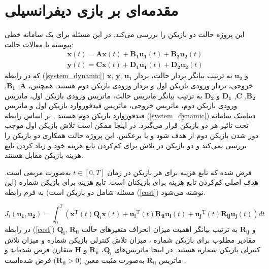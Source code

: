 \section{ مقدمه‌ای بر بازی دیفرانسیلی}\label{diffgameover}

 این پروژه حالت دو بازیکن را بررسی می‌کند. در این مسئله برای یک سامانه خطی پیوسته با معالات حالت:
 \begin{equation}\label{system_dynamic}
 	\begin{split}
 		 	&\boldsymbol{\dot x}(t) = \boldsymbol{Ax}(t) + \boldsymbol{B_1u_1}(t) + \boldsymbol{B_2u_2}(t)%
 		\\
 		&\boldsymbol{y}(t) = \boldsymbol{Cx}(t) + \boldsymbol{D_1u_1}(t) + \boldsymbol{D_2u_2}(t)
 	\end{split}
 \end{equation}
که در رابطه (\ref{system_dynamic})
$\boldsymbol x$, $\boldsymbol y$, $\boldsymbol{u_1}$
و
$\boldsymbol{u_2}$
به ترتیب بیانگر بردار حالت، بردار خروجی، بردار ورودی بازیکن اول و بردار ورودی بازیکن دوم هستند. همچنین، 
$\boldsymbol A$, $\boldsymbol{B_1}$, $\boldsymbol {B_2}$, $\boldsymbol C$, $\boldsymbol {D_1}$
و
$\boldsymbol{D_2}$
به ترتیب بیانگر ماتریس حالت، ماتریس ورودی بازیکن اول، ماتریس ورودی بازیکن دوم، ماتریس خروجی، ماتریس فیدفوروارد بازیکن اول و ماتریس فیدفوروارد بازیکن دوم هستند
\cite{mct}.
بر اساس رابطه (\ref{system_dynamic}) دینامیک سامانه تحت تاثیر هر دو بازیکن قرار می‌گیرد. در اینجا ممکن است تلاش  بازیکن اول موجب دور شدن بازیکن دوم از هدف شود و یا برعکس.  این پروژه حالت همکاری دو بازیکن را بررسی نمی‌کند و دو بازیکن در تلاش برای کم‌کردن تابع هزینه خود و زیاد کردن تابع هزینه بازیکن مقابل هستند.


  فرض شده  که تابع هزینه برای هر بازیکن در زمان $t \in [0, T]$ به‌صورت مربعی است.
  هدف اصلی کم‌کردن تابع هزینه برای بازیکنان است. تابع هزینه برای بازیکن شماره   (این مسئله شامل دو بازیکن است) به فرم رابطه (\ref{cost}) نوشته می‌شود.

 \begin{equation}\label{cost}
 	J_i( \boldsymbol{u_1},  \boldsymbol{u_2}) = \int_{0}^{T}\left( \boldsymbol{x} ^\mathrm{T}(t) \boldsymbol{Q_i} \boldsymbol{x}(t)+
 	 \boldsymbol{u_i} ^\mathrm{T}(t) \boldsymbol{R_{ii}} \boldsymbol{u_i}(t)+
 	 \boldsymbol{u_j} ^\mathrm{T}(t)\boldsymbol{ R_{ij} u_j}(t)
 	\right)dt
  \end{equation}
در رابطه
(\ref{cost})
$\boldsymbol{Q_i}$, $\boldsymbol{R_{ii}}$
و
$\boldsymbol{R_{ij}}$
به ترتیب بیانگر اهمیت میزان انحراف متغیرهای حالت مقادیر مطلوب برای بازیکن شماره ، میزان تلاش کنترلی بازیکن شماره  و میزان تلاش کنترلی بازیکن شماره   هستند.
در اینجا ماتریس‌های 
$\boldsymbol{Q_i}$، $\boldsymbol{R_{ii}}$
و
$\boldsymbol{H}$
متقارن فرض شده‌اند و ماتریس 
$\boldsymbol{R_{ii}}$
به‌صورت مثبت معین ($\boldsymbol{R_{ii}}>0$)
فرض شده‌است \cite{article1}.

